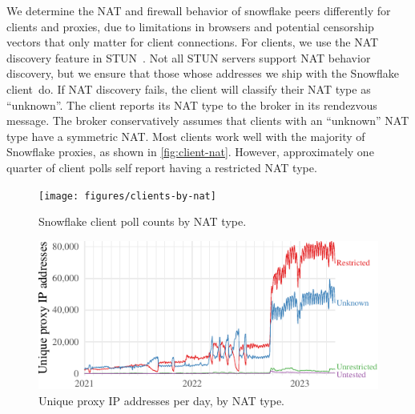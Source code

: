 \documentclass[letterpaper,twocolumn]{article}
\begin{document}
We determine the NAT and firewall behavior of snowflake peers
differently for clients and proxies, due to
limitations in browsers and potential censorship vectors that
only matter for client connections.
For clients, we use the NAT discovery feature in STUN~\cite{rfc5780}.
Not all STUN servers support NAT behavior discovery,
but we ensure that those whose addresses we ship with the Snowflake client~do.
If NAT discovery fails, the client will classify their NAT type as ``unknown''.
The client reports its NAT type to the broker
in its rendezvous message.
The broker conservatively assumes that clients
with an ``unknown'' NAT type have a symmetric NAT.
Most clients work well with the majority of Snowflake proxies, as
shown in \autoref{fig:client-nat}.
However, approximately one quarter of client polls
self report having a restricted NAT type.

\begin{figure}[t]
\texttt{[image: figures/clients-by-nat]}
\caption{Snowflake client poll counts by NAT type.}
\label{fig:client-nat}
\bigskip
\includegraphics{figures/proxies/proxy-nat-type}
\caption{
Unique proxy IP addresses per day,
by NAT type.
}
\label{fig:proxy-nat}
\end{figure}
\end{document}

